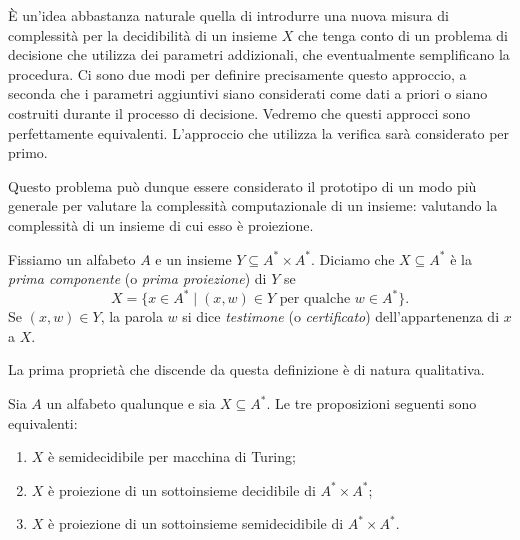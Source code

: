 È un'idea abbastanza naturale quella di introdurre una nuova misura di complessità per la decidibilità di un insieme $X$ che tenga conto di un problema di decisione che utilizza dei parametri addizionali, che eventualmente semplificano la procedura. Ci sono due modi per definire precisamente questo approccio, a seconda che i parametri aggiuntivi siano considerati come dati a priori o siano costruiti durante il processo di decisione. Vedremo che questi approcci sono perfettamente equivalenti. L'approccio che utilizza la verifica sarà considerato per primo.

Questo problema può dunque essere considerato il prototipo di un modo più generale per valutare la complessità computazionale di un insieme: valutando la complessità di un insieme di cui esso è proiezione.

\begin{defi}
Fissiamo un alfabeto $A$ e un insieme $Y\subseteq A^*\times A^*$. Diciamo che $X\subseteq A^*$ è la \emph{prima componente} (o \emph{prima proiezione}) di $Y$ se
\[
X=\{x\in A^*\mid (x,w)\in Y\text{ per qualche } w\in A^*\}.
\]
Se $(x,w)\in Y$, la parola $w$ si dice \emph{testimone} (o \emph{certificato}) dell'appartenenza di $x$ a $X$.
\end{defi}

La prima proprietà che discende da questa definizione è di natura qualitativa.

\begin{prop}
Sia $A$ un alfabeto qualunque e sia $X\subseteq A^*$. Le tre proposizioni seguenti sono equivalenti:
\begin{enumerate}
\item $X$ è semidecidibile per macchina di Turing;
\item $X$ è proiezione di un sottoinsieme decidibile di $A^*\times A^*$;
\item $X$ è proiezione di un sottoinsieme semidecidibile di $A^*\times A^*$.
\end{enumerate}
\end{prop}

